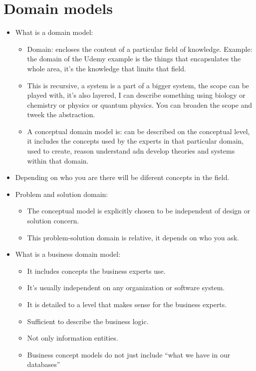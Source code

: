 \section{Domain models}
\begin{itemize}
    \item What is a domain model:
        \begin{itemize}
            \item Domain: encloses the content of a particular field of knowledge. Example: the domain of the Udemy example is the things that encapsulates the whole area, it's the knowledge that limits that field.
            \item This is recursive, a system is a part of a bigger system, the scope can be played with, it's also layered, I can describe something using biology or chemistry or physics or quantum physics. You can broaden the scope and tweek the abstraction.
            \item A conceptual domain model is: can be described on the conceptual level, it includes the concepts used by the experts in that particular domain, used to create, reason understand adn develop theories and systems within that domain.
        \end{itemize}
    
    \item Depending on who you are there will be diferent concepts in the field.
    \item Problem and solution domain: 
        \begin{itemize}
            \item The conceptual model is explicitly chosen to be independent of design or solution concern. 
            \item This problem-solution domain is relative, it depends on who you ask. 
        \end{itemize}
    
    \item What is a business domain model:
        \begin{itemize}
            \item It includes concepts the business experts use. 
            \item It's usually independent on any organization or software system.
            \item It is detailed to a level that makes sense for the business experts. 
            \item Sufficient to describe the business logic. 
            \item Not only information entities.
            \item Business concept models do not just include ``what we have in our databases''
        \end{itemize}
\end{itemize}



